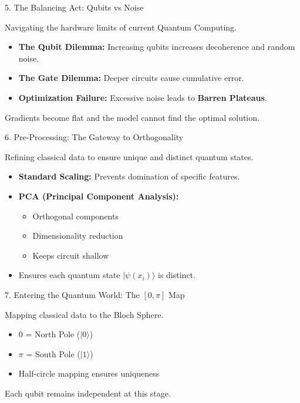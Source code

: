\documentclass{beamer}
\begin{document}
\begin{frame}{5. The Balancing Act: Qubits vs Noise}

Navigating the hardware limits of current Quantum Computing.

\begin{itemize}
    \item \textbf{The Qubit Dilemma:}
    Increasing qubits increases decoherence and random noise.
    
    \item \textbf{The Gate Dilemma:}
    Deeper circuits cause cumulative error.
    
    \item \textbf{Optimization Failure:}
    Excessive noise leads to \textbf{Barren Plateaus}.
\end{itemize}

Gradients become flat and the model cannot find the optimal solution.

\end{frame}

\begin{frame}{6. Pre-Processing: The Gateway to Orthogonality}

Refining classical data to ensure unique and distinct quantum states.

\begin{itemize}
    \item \textbf{Standard Scaling:}
    Prevents domination of specific features.
    
    \item \textbf{PCA (Principal Component Analysis):}
    \begin{itemize}
        \item Orthogonal components
        \item Dimensionality reduction
        \item Keeps circuit shallow
    \end{itemize}
    
    \item Ensures each quantum state $|\psi(x_i)\rangle$ is distinct.
\end{itemize}

\end{frame}

\begin{frame}{7. Entering the Quantum World: The $[0,\pi]$ Map}

Mapping classical data to the Bloch Sphere.

\begin{itemize}
    \item $0$ = North Pole ($|0\rangle$)
    \item $\pi$ = South Pole ($|1\rangle$)
    \item Half-circle mapping ensures uniqueness
\end{itemize}

Each qubit remains independent at this stage.

\end{frame}
\end{document}
